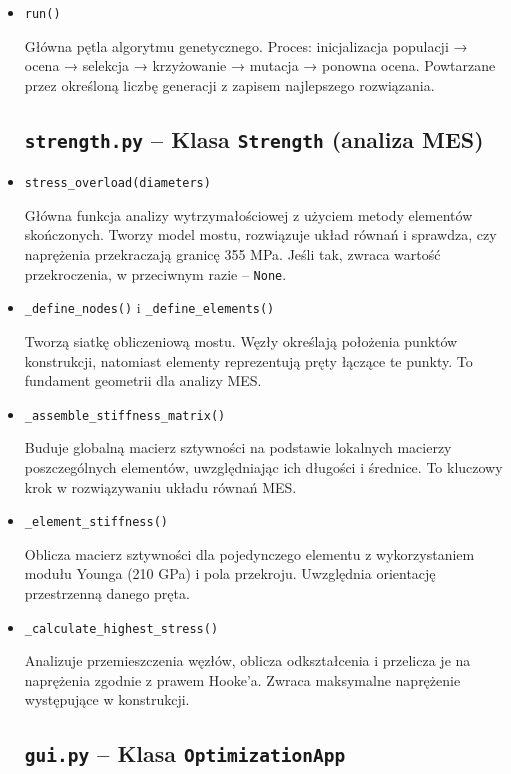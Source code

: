\documentclass[12pt,a4paper]{article}
\begin{document}
\begin{itemize}
\item{\texttt{run()}}

Główna pętla algorytmu genetycznego. Proces: inicjalizacja populacji → ocena → selekcja → krzyżowanie → mutacja → ponowna ocena. Powtarzane przez określoną liczbę generacji z zapisem najlepszego rozwiązania.

\subsection{\texttt{strength.py} – Klasa \texttt{Strength} (analiza MES)}

\item{\texttt{stress\_overload(diameters)}}

Główna funkcja analizy wytrzymałościowej z użyciem metody elementów skończonych. Tworzy model mostu, rozwiązuje układ równań i sprawdza, czy naprężenia przekraczają granicę 355 MPa. Jeśli tak, zwraca wartość przekroczenia, w przeciwnym razie – \texttt{None}.

\item{\texttt{\_define\_nodes()} i \texttt{\_define\_elements()}}

Tworzą siatkę obliczeniową mostu. Węzły określają położenia punktów konstrukcji, natomiast elementy reprezentują pręty łączące te punkty. To fundament geometrii dla analizy MES.

\item {\texttt{\_assemble\_stiffness\_matrix()}}

Buduje globalną macierz sztywności na podstawie lokalnych macierzy poszczególnych elementów, uwzględniając ich długości i średnice. To kluczowy krok w rozwiązywaniu układu równań MES.

\item {\texttt{\_element\_stiffness()}}

Oblicza macierz sztywności dla pojedynczego elementu z wykorzystaniem modułu Younga (210 GPa) i pola przekroju. Uwzględnia orientację przestrzenną danego pręta.

\item {\texttt{\_calculate\_highest\_stress()}}

Analizuje przemieszczenia węzłów, oblicza odkształcenia i przelicza je na naprężenia zgodnie z prawem Hooke'a. Zwraca maksymalne naprężenie występujące w konstrukcji.

\subsection{\texttt{gui.py} – Klasa \texttt{OptimizationApp}}


\end{itemize}
\end{document}
